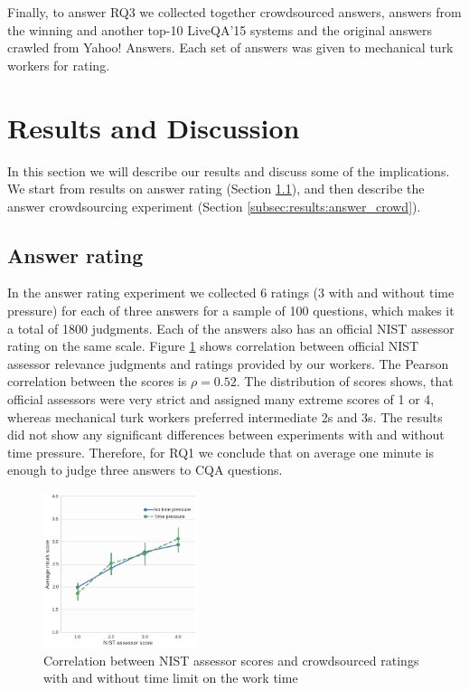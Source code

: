 \documentclass[11pt,letterpaper]{article}
\begin{document}
Finally, to answer RQ3 we collected together crowdsourced answers, answers from the winning and another top-10 LiveQA'15 systems and the original answers crawled from Yahoo! Answers.
Each set of answers was given to mechanical turk workers for rating.


\section{Results and Discussion}
\label{sec:results}

In this section we will describe our results and discuss some of the implications.
We start from results on answer rating (Section \ref{subsec:results:answer_rating}), and then describe the answer crowdsourcing experiment (Section \ref{subsec:results:answer_crowd}).

\subsection{Answer rating}
\label{subsec:results:answer_rating}

In the answer rating experiment we collected 6 ratings (3 with and without time pressure) for each of three answers for a sample of 100 questions, which makes it a total of 1800 judgments.
Each of the answers also has an official NIST assessor rating on the same scale.
Figure \ref{figure:score_correlation} shows correlation between official NIST assessor relevance judgments and ratings provided by our workers.
The Pearson correlation between the scores is $\rho=0.52$.
The distribution of scores shows, that official assessors were very strict and assigned many extreme scores of 1 or 4, whereas mechanical turk workers preferred intermediate 2s and 3s.
The results did not show any significant differences between experiments with and without time pressure.
Therefore, for RQ1 we conclude that on average one minute is enough to judge three answers to CQA questions.


\begin{figure}[t!]
	\centering
	\includegraphics[width=0.4\textwidth]{img/score_correlation}
	\caption{Correlation between NIST assessor scores and crowdsourced ratings with and without time limit on the work time}
	\label{figure:score_correlation}
\end{figure}
	
\end{document}
